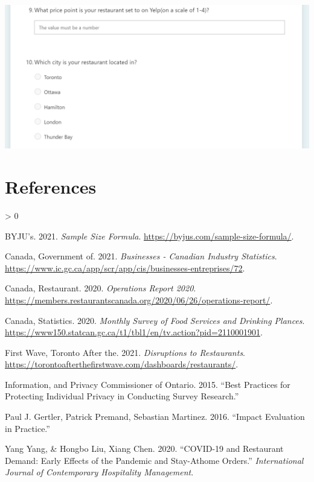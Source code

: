 \documentclass[
]{article}
\newlength{\cslhangindent}
\newenvironment{CSLReferences}[2] %
 {%
  \setlength{\parindent}{0pt}
  \ifodd #1 \everypar{\setlength{\hangindent}{\cslhangindent}}\ignorespaces\fi
  \ifnum #2 > 0
  \setlength{\parskip}{#2\baselineskip}
  \fi
 }%
 {}
\begin{document}
\includegraphics{"../../inputs/survey_q9_q10.png"}

\newpage

\hypertarget{references}{%
\section*{References}\label{references}}

\hypertarget{refs}{}
\begin{CSLReferences}{1}{0}
\leavevmode\hypertarget{ref-Samplesize}{}%
BYJU's. 2021. \emph{Sample Size Formula}. \url{https://byjus.com/sample-size-formula/}.

\leavevmode\hypertarget{ref-govCan}{}%
Canada, Government of. 2021. \emph{Businesses - Canadian Industry Statistics}. \url{https://www.ic.gc.ca/app/scr/app/cis/businesses-entreprises/72}.

\leavevmode\hypertarget{ref-restCan}{}%
Canada, Restaurant. 2020. \emph{Operations Report 2020}. \url{https://members.restaurantscanada.org/2020/06/26/operations-report/}.

\leavevmode\hypertarget{ref-RData}{}%
Canada, Statistics. 2020. \emph{Monthly Survey of Food Services and Drinking Plances}. \url{https://www150.statcan.gc.ca/t1/tbl1/en/tv.action?pid=2110001901}.

\leavevmode\hypertarget{ref-yelpCan}{}%
First Wave, Toronto After the. 2021. \emph{Disruptions to Restaurants}. \url{https://torontoafterthefirstwave.com/dashboards/restaurants/}.

\leavevmode\hypertarget{ref-citeLit6}{}%
Information, and Privacy Commissioner of Ontario. 2015. {``Best Practices for Protecting Individual Privacy in Conducting Survey Research.''}

\leavevmode\hypertarget{ref-citeLit7}{}%
Paul J. Gertler, Patrick Premand, Sebastian Martinez. 2016. {``Impact Evaluation in Practice.''}

\leavevmode\hypertarget{ref-citeLit1}{}%
Yang Yang, \& Hongbo Liu, Xiang Chen. 2020. {``COVID-19 and Restaurant Demand: Early Effects of the Pandemic and Stay-Athome Orders.''} \emph{International Journal of Contemporary Hospitality Management}.

\end{CSLReferences}
\end{document}
